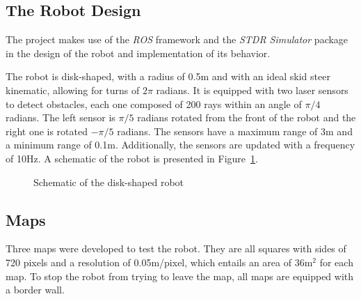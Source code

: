 \documentclass[10pt,journal,compsoc]{IEEEtran}
\begin{document}
\subsection{The Robot Design}

The project makes use of the \textit{ROS} framework and the \textit{STDR Simulator} package in the design of the robot and implementation of its behavior.

The robot is disk-shaped, with a radius of 0.5m and with an ideal skid steer kinematic, allowing for turns of $2\pi$ radians. It is equipped with two laser sensors to detect obstacles, each one composed of 200 rays within an angle of $\pi/4$ radians. The left sensor is $\pi/5$ radians rotated from the front of the robot and the right one is rotated $-\pi/5$ radians. The sensors have a maximum range of 3m and a minimum range of 0.1m. Additionally, the sensors are updated with a frequency of 10Hz. A schematic of the robot is presented in Figure~\ref{fig:robot}.


\begin{figure}[thpb]
\centering
{}
\caption{Schematic of the disk-shaped robot}
\label{fig:robot}
\end{figure}


\subsection{Maps}
Three maps were developed to test the robot. They are all squares with sides of 720 pixels and a resolution of 0.05m/pixel, which entails an area of 36m$^2$ for each map. To stop the robot from trying to leave the map, all maps are equipped with a border wall.
\end{document}
